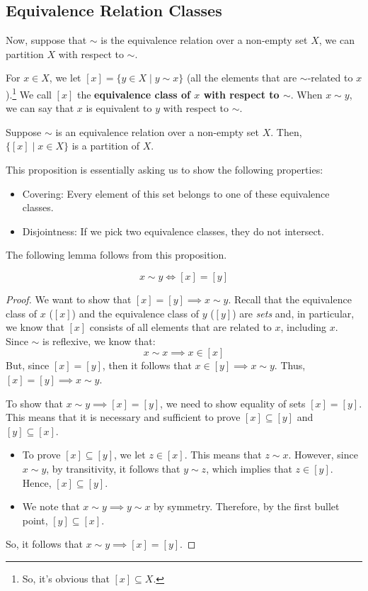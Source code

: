 \documentclass[letterpaper]{article}
\begin{document}
\subsection{Equivalence Relation Classes}
Now, suppose that $\sim$ is the equivalence relation over a non-empty set $X$, we can partition $X$ with respect to $\sim$. 

\bigskip 

For $x \in X$, we let $[x] = \{y \in X \mid y \sim x\}$ (all the elements that are $\sim$-related to $x$).\footnote{So, it's obvious that $[x] \subseteq X$.} We call $[x]$ the \textbf{equivalence class of $x$ with respect to $\sim$}. When $x \sim y$, we can say that $x$ is equivalent to $y$ with respect to $\sim$. 

\begin{proposition}
    Suppose $\sim$ is an equivalence relation over a non-empty set $X$. Then, $\{[x] \mid x \in X\}$ is a partition of $X$. 
\end{proposition}
This proposition is essentially asking us to show the following properties: 
\begin{itemize}
    \item Covering: Every element of this set belongs to one of these equivalence classes. 
    \item Disjointness: If we pick two equivalence classes, they do not intersect.
\end{itemize}
The following lemma follows from this proposition.
\begin{lemma}{}{}
    \[x \sim y \iff [x] = [y]\]
\end{lemma}
\begin{framed}
    \begin{proof}
        We want to show that $[x] = [y] \implies x \sim y$. Recall that the equivalence class of $x$ ($[x]$) and the equivalence class of $y$ ($[y]$) are \emph{sets} and, in particular, we know that $[x]$ consists of all elements that are related to $x$, including $x$. Since $\sim$ is reflexive, we know that:
        \[x \sim x \implies x \in [x]\]
        But, since $[x] = [y]$, then it follows that $x \in [y] \implies x \sim y$. Thus, $[x] = [y] \implies x \sim y$. 
        
        \bigskip 
    
        To show that $x \sim y \implies [x] = [y]$, we need to show equality of sets $[x] = [y]$. This means that it is necessary and sufficient to prove $[x] \subseteq [y]$ and $[y] \subseteq [x]$.
        \begin{itemize}
            \item To prove $[x] \subseteq [y]$, we let $z \in [x]$. This means that $z \sim x$. However, since $x \sim y$, by transitivity, it follows that $y \sim z$, which implies that $z \in [y]$. Hence, $[x] \subseteq [y]$. 
            \item We note that $x \sim y \implies y \sim x$ by symmetry. Therefore, by the first bullet point, $[y] \subseteq [x]$.
        \end{itemize} 
        So, it follows that $x \sim y \implies [x] = [y]$. 
    \end{proof}
\end{framed}
\end{document}
